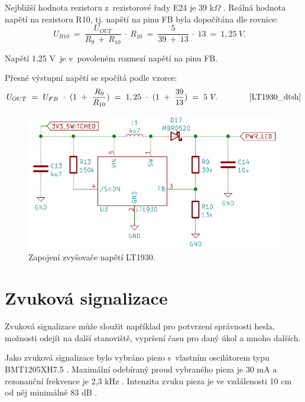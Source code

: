 Nejbližší hodnota rezistoru z~rezistorové řady E24 je 39 k$\Omega$ \cite{rezistorova_rada}. Reálná hodnota napětí na rezistoru R10, tj. napětí na pinu FB byla dopočítána
dle rovnice:
\begin{equation} 
  U_{R10}~=~\frac{U_{OUT}}{R_{9}~+~R_{10}}~\cdot~R_{10}~=~\frac{5}{39~+~13}~\cdot~13~=~1,25~V. 
  \quad
\label{eq:UR10}
\end{equation}

Napětí 1,25 V~je v~povoleném rozmezí napětí na pinu FB. 

Přesné výstupní napětí se spočítá podle vzorce:
\begin{equation} 
  U_{OUT}~=~U_{FB}~\cdot~(1~+~\frac{R_{9}}{R_{10}})~=~1,25~\cdot~(1~+~\frac{39}{13})~=~5~V. 
  \quad \quad \quad \quad \cite{LT1930_dtsh}
\label{eq:VOUT_LT1930}
\end{equation}

\begin{figure}[!h]
  \begin{center}
    \includegraphics[scale=0.7]{obrazky/LT1930.png}
  \end{center}
  \caption[Zapojení zvyšovače napětí LT1930]{Zapojení zvyšovače napětí LT1930.}
\end{figure}

\section{Zvuková signalizace}
Zvuková signalizace může sloužit například pro potvrzení správnosti hesla, možnosti odejít na další stanoviště, vypršení času pro daný úkol a mnoho dalších. 

Jako zvuková signalizace bylo vybráno piezo s~vlastním oscilátorem typu \\BMT1205XH7.5 \cite{piezo_dtsh}. Maximální odebíraný proud vybraného pieza je 30 mA a rezonanční frekvence 
je 2,3 kHz \cite{piezo_dtsh}. Intenzita zvuku pieza je ve vzdálenosti 10 cm od něj minimálně 83 dB \cite{piezo_dtsh}.


